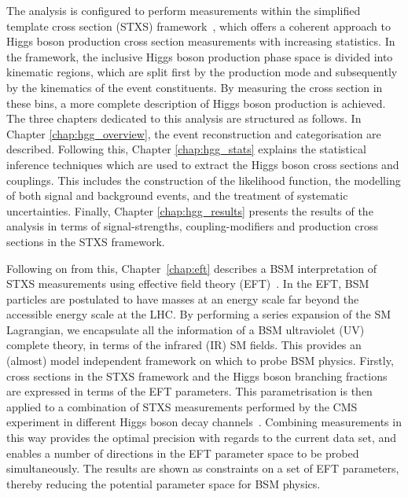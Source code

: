 The \Hgg analysis is configured to perform measurements within the simplified template cross section (STXS) framework~\cite{deFlorian:2016spz}, which offers a coherent approach to Higgs boson production cross section measurements with increasing statistics. In the framework, the inclusive Higgs boson production phase space is divided into kinematic regions, which are split first by the production mode and subsequently by the kinematics of the event constituents. By measuring the cross section in these bins, a more complete description of Higgs boson production is achieved. The three chapters dedicated to this analysis are structured as follows. In Chapter \ref{chap:hgg_overview}, the event reconstruction and categorisation are described. Following this, Chapter \ref{chap:hgg_stats} explains the statistical inference techniques which are used to extract the Higgs boson cross sections and couplings. This includes the construction of the likelihood function, the modelling of both signal and background events, and the treatment of systematic uncertainties. Finally, Chapter \ref{chap:hgg_results} presents the results of the analysis in terms of signal-strengths, coupling-modifiers and production cross sections in the STXS framework.

Following on from this, Chapter~\ref{chap:eft} describes a BSM interpretation of STXS measurements using effective field theory (EFT)~\cite{BUCHMULLER1986621,Hagiwara:1993qt,Giudice_2007,Grzadkowski:2010es,Contino:2013kra}. In the EFT, BSM particles are postulated to have masses at an energy scale far beyond the accessible energy scale at the LHC. By performing a series expansion of the SM Lagrangian, we encapsulate all the information of a BSM ultraviolet (UV) complete theory, in terms of the infrared (IR) SM fields. This provides an (almost) model independent framework on which to probe BSM physics. Firstly, cross sections in the STXS framework and the Higgs boson branching fractions are expressed in terms of the EFT parameters. This parametrisation is then applied to a combination of STXS measurements performed by the CMS experiment in different Higgs boson decay channels~\cite{CMS-PAS-HIG-19-005}. Combining measurements in this way provides the optimal precision with regards to the current data set, and enables a number of directions in the EFT parameter space to be probed simultaneously. The results are shown as constraints on a set of EFT parameters, thereby reducing the potential parameter space for BSM physics.

